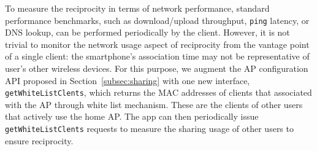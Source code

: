 To measure the reciprocity in terms of network performance, standard performance
benchmarks, such as download/upload throughput, \texttt{ping} latency, or DNS
lookup, can be performed periodically by the \wisefi{} client. However, it is
not trivial to monitor the network usage aspect of reciprocity from the vantage
point of a single client: the smartphone's association time may not be
representative of user's other wireless devices. For this purpose, we augment
the AP configuration API proposed in Section~\ref{subsec:sharing} with one new
interface, \texttt{getWhiteListClents}, which returns the MAC addresses of
clients that associated with the AP through white list mechanism. These are the
clients of other \wisefi{} users that actively use the home AP. The \wisefi{}
app can then periodically issue \texttt{getWhiteListClents} requests to measure
the sharing usage of other \wisefi{} users to ensure reciprocity.
